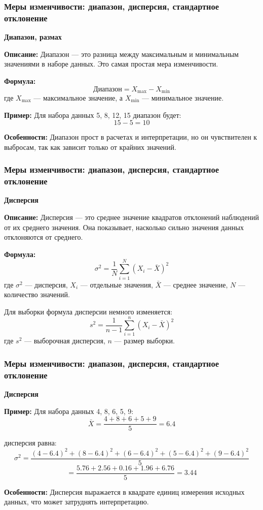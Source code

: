 \documentclass[aspectratio=169]{beamer}
\begin{document}
\begin{frame}
\frametitle{Меры изменчивости: диапазон, дисперсия, стандартное отклонение}
\textbf{Диапазон, размах}

\textbf{Описание:} Диапазон — это разница между максимальным и минимальным значениями в наборе данных. Это самая простая мера изменчивости.

\textbf{Формула:}
  \[
  \text{Диапазон} = X_{\text{max}} - X_{\text{min}}
  \]
где \(X_{\text{max}}\) — максимальное значение, а \(X_{\text{min}}\) — минимальное значение.

\textbf{Пример:} Для набора данных 5, 8, 12, 15 диапазон будет:
  \[
  15 - 5 = 10
  \]

\textbf{Особенности:} Диапазон прост в расчетах и интерпретации, но он чувствителен к выбросам, так как зависит только от крайних значений.
\end{frame}

\begin{frame}
\frametitle{Меры изменчивости: диапазон, дисперсия, стандартное отклонение}
\textbf{Дисперсия}

\textbf{Описание:} Дисперсия — это среднее значение квадратов отклонений наблюдений от их среднего значения. Она показывает, насколько сильно значения данных отклоняются от среднего.

\textbf{Формула:}
  \[
  \sigma^2 = \frac{1}{N} \sum_{i=1}^{N} (X_i - \bar{X})^2
  \]
где \(\sigma^2\) — дисперсия, \(X_i\) — отдельные значения, \(\bar{X}\) — среднее значение, \(N\) — количество значений.


Для выборки формула дисперсии немного изменяется:
  \[
  s^2 = \frac{1}{n-1} \sum_{i=1}^{n} (X_i - \bar{X})^2
  \]
где \(s^2\) — выборочная дисперсия, \(n\) — размер выборки.
\end{frame}

\begin{frame}
\frametitle{Меры изменчивости: диапазон, дисперсия, стандартное отклонение}
\textbf{Дисперсия}

\textbf{Пример:} Для набора данных 4, 8, 6, 5, 9:
  \[
  \bar{X} = \frac{4 + 8 + 6 + 5 + 9}{5} = 6.4
  \]

дисперсия равна:
  \[
  \sigma^2 = \frac{(4-6.4)^2 + (8-6.4)^2 + (6-6.4)^2 + (5-6.4)^2 + (9-6.4)^2}{5}
  \]
  \[
  = \frac{5.76 + 2.56 + 0.16 + 1.96 + 6.76}{5} = 3.44
  \]

\textbf{Особенности:} Дисперсия выражается в квадрате единиц измерения исходных данных, что может затруднять интерпретацию.
\end{frame}
\end{document}
